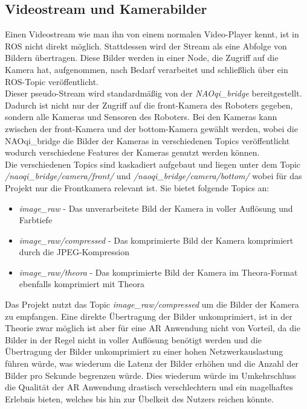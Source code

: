 \subsection{Videostream und Kamerabilder}
Einen Videostream wie man ihn von einem normalen Video-Player kennt, ist in \ac{ROS} nicht direkt möglich. Stattdessen wird der Stream als eine Abfolge von Bildern übertragen. Diese Bilder werden in einer Node, die Zugriff auf die Kamera hat, aufgenommen, nach Bedarf verarbeitet und schließlich über ein \ac{ROS}-Topic veröffentlicht.\\
Dieser pseudo-Stream wird standardmäßig von der \textit{NAOqi\_bridge} bereitgestellt. Dadurch ist nicht nur der Zugriff auf die front-Kamera des Roboters gegeben, sondern alle Kameras und Sensoren des Roboters. Bei den Kameras kann zwischen der front-Kamera und der bottom-Kamera gewählt werden, wobei die NAOqi\_bridge die Bilder der Kameras in verschiedenen Topics veröffentlicht wodurch verschiedene Features der Kameras genutzt werden können.\\
Die verschiedenen Topics sind kaskadiert aufgebaut und liegen unter dem Topic \textit{/naoqi\_bridge/camera/front/} und \textit{/naoqi\_bridge/camera/bottom/} wobei für das Projekt nur die Frontkamera relevant ist. Sie bietet folgende Topics an:
\begin{itemize}
    \item \textit{image\_raw} - Das unverarbeitete Bild der Kamera in voller Auflösung und Farbtiefe
    \item \textit{image\_raw/compressed} - Das komprimierte Bild der Kamera komprimiert durch die \ac{JPEG}-Kompression
    \item \textit{image\_raw/theora} - Das komprimierte Bild der Kamera im Theora-Format ebenfalls komprimiert mit Theora
\end{itemize}
Das Projekt nutzt das Topic \textit{image\_raw/compressed} um die Bilder der Kamera zu empfangen. Eine direkte Übertragung der Bilder unkomprimiert, ist in der Theorie zwar möglich ist aber für eine \ac{AR} Anwendung nicht von Vorteil, da die Bilder in der Regel nicht in voller Auflösung benötigt werden und die Übertragung der Bilder unkomprimiert zu einer hohen Netzwerkauslastung führen würde, was wiederum die Latenz der Bilder erhöhen und die Anzahl der Bilder pro Sekunde begrenzen würde. Dies wiederum würde im Umkehrschluss die Qualität der \ac{AR} Anwendung drastisch verschlechtern und ein magelhaftes Erlebnis bieten, welches bis hin zur Übelkeit des Nutzers reichen könnte.\\
